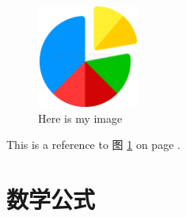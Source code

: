\documentclass[a4paper,12pt]{article}
\begin{document}
        \begin{figure}[H] %
            \centering    %
            \includegraphics[width=0.3\textwidth]{1} %
            \caption{Here is my image} %
            \label{image-1} %
        \end{figure}
        
         This is a reference to 图 \ref{image-1} on page \pageref{image-1}.

    
    \section{数学公式}
\end{document}
